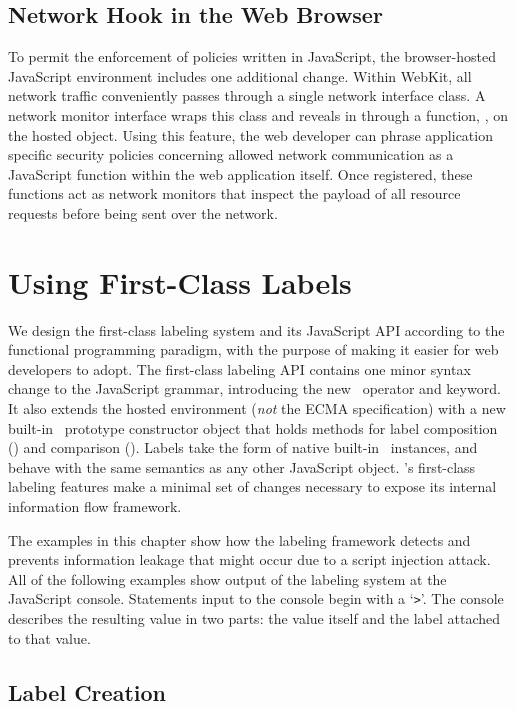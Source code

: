 \subsection{Network Hook in the Web Browser}

To permit the enforcement of policies written in JavaScript, the browser-hosted JavaScript environment includes one additional change.
Within WebKit, all network traffic conveniently passes through a single network interface class.
A network monitor interface wraps this class and reveals in through a function, , on the hosted  object.
Using this feature, the web developer can phrase application specific security policies concerning allowed network communication as a JavaScript function within the web application itself.
Once registered, these functions act as network monitors that inspect the payload of all resource requests before being sent over the network.

\section{Using First-Class Labels}
\label{sec:using-first-class-labels}

We design the first-class labeling system and its JavaScript API according to the functional programming paradigm, with the purpose of making it easier for web developers to adopt.
The first-class labeling API contains one minor syntax change to the JavaScript grammar, introducing the new \mlabelof\ operator and keyword.
It also extends the hosted environment (\emph{not} the ECMA specification) with a new built-in \FlowLabel\ prototype constructor object that holds methods for label composition (\mjoin) and comparison (\msubsumes).
Labels take the form of native built-in \FlowLabelObject\ instances, and behave with the same semantics as any other JavaScript object.
\JitFlow's first-class labeling features make a minimal set of changes necessary to expose its internal information flow framework.

The examples in this chapter show how the labeling framework detects and prevents information leakage that might occur due to a script injection attack.
All of the following examples show output of the labeling system at the JavaScript console.
Statements input to the console begin with a `\verb|>|'.
The console describes the resulting value in two parts: the value itself and the label attached to that value.

\subsection{Label Creation}

